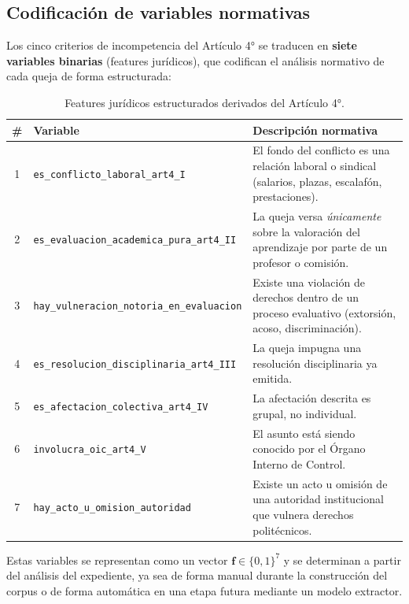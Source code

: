 \subsection{Codificación de variables normativas}

Los cinco criterios de incompetencia del Artículo 4° se traducen en
\textbf{siete variables binarias} (features jurídicos), que codifican el
análisis normativo de cada queja de forma estructurada:

\begin{table}[H]
\centering
\caption{Features jurídicos estructurados derivados del Artículo 4°.}
\label{tab:features_mt}
\begin{tabularx}{\textwidth}{clX}
\toprule
\textbf{\#} & \textbf{Variable} & \textbf{Descripción normativa} \\
\midrule
1 & \texttt{es\_conflicto\_laboral\_art4\_I} &
    El fondo del conflicto es una relación laboral o sindical
    (salarios, plazas, escalafón, prestaciones). \\
2 & \texttt{es\_evaluacion\_academica\_pura\_art4\_II} &
    La queja versa \emph{únicamente} sobre la valoración del
    aprendizaje por parte de un profesor o comisión. \\
3 & \texttt{hay\_vulneracion\_notoria\_en\_evaluacion} &
    Existe una violación de derechos dentro de un proceso
    evaluativo (extorsión, acoso, discriminación). \\
4 & \texttt{es\_resolucion\_disciplinaria\_art4\_III} &
    La queja impugna una resolución disciplinaria ya emitida. \\
5 & \texttt{es\_afectacion\_colectiva\_art4\_IV} &
    La afectación descrita es grupal, no individual. \\
6 & \texttt{involucra\_oic\_art4\_V} &
    El asunto está siendo conocido por el Órgano Interno de
    Control. \\
7 & \texttt{hay\_acto\_u\_omision\_autoridad} &
    Existe un acto u omisión de una autoridad institucional
    que vulnera derechos politécnicos. \\
\bottomrule
\end{tabularx}
\end{table}

Estas variables se representan como un vector $\mathbf{f} \in \{0, 1\}^7$ y
se determinan a partir del análisis del expediente, ya sea de forma manual
durante la construcción del corpus o de forma automática en una etapa futura
mediante un modelo extractor.

